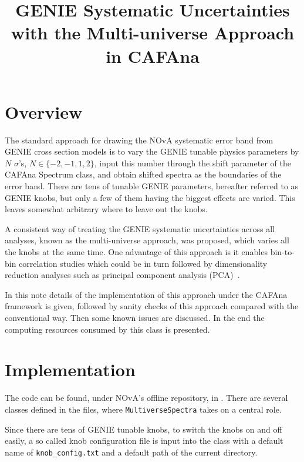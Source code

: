 \documentclass[12pt,a4paper,final]{iopart}
\begin{document}
\title{GENIE Systematic Uncertainties with the Multi-universe Approach in CAFAna}

\section{Overview}
The standard approach for drawing the NOvA systematic error band from GENIE cross section models is to vary the GENIE tunable physics parameters by $N$ $\sigma$'s, $N\in\{-2,-1,1,2\}$, input this number through the shift parameter of the CAFAna Spectrum class, and obtain shifted spectra as the boundaries of the error band. There are tens of tunable GENIE parameters, hereafter referred to as GENIE knobs, but only a few of them having the biggest effects are varied. This leaves somewhat arbitrary where to leave out the knobs.

A consistent way of treating the GENIE systematic uncertainties across all analyses, known as the multi-universe approach, was proposed, which varies all the knobs at the same time. One advantage of this approach is it enables bin-to-bin correlation studies which could be in turn followed by dimensionality reduction analyses such as principal component analysis (PCA)~\cite{ref1}.

In this note details of the implementation of this approach under the CAFAna framework is given, followed by sanity checks of this approach compared with the conventional way. Then some known issues are discussed. In the end the computing resources consumed by this class is presented.

\section{Implementation}
The code can be found, under NOvA's offline repository, in . There are several classes defined in the files, where \texttt{MultiverseSpectra} takes on a central role.

Since there are tens of GENIE tunable knobs, to switch the knobs on and off easily, a so called knob configuration file is input into the class with a default name of \texttt{knob\_config.txt} and a default path of the current directory.
\end{document}
